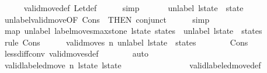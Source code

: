 \begin{isabellebody}
\ \ \ \ \isamarkupfalse%
\ valid{\isacharunderscore}move{\isacharprime}{\isacharunderscore}def\ Let{\isacharunderscore}def\isanewline
\ \ \ \ \isamarkupfalse%
\ simp\isanewline
\ \ \isamarkupfalse%
\ \isamarkupfalse%
\ {\isacharasterisk}{\isacharcolon}\ {\isachardoublequoteopen}unlabel\ {\isacharquery}l{\isacharunderscore}state{\isacharprime}\ {\isacharequal}\ state{\isacharprime}{\isachardoublequoteclose}\isanewline
\ \ \ \ \isamarkupfalse%
\ unlabel{\isacharunderscore}valid{\isacharunderscore}move{\isacharprime}{\isacharbrackleft}OF\ Cons{\isacharparenleft}{}{\isacharparenright}\ {\isacharasterisk}{\isacharasterisk}{\isacharcomma}\ THEN\ conjunct{}{\isacharbrackright}\isanewline
\ \ \ \ \isamarkupfalse%
\ simp\isanewline
\isanewline
\ \ \isamarkupfalse%
\ {\isachardoublequoteopen}map\ unlabel\ {\isacharparenleft}label{\isacharunderscore}moves{\isacharunderscore}max{\isacharunderscore}stone\ {\isacharquery}l{\isacharunderscore}state{\isacharprime}\ states{\isacharparenright}\ {\isacharequal}\ unlabel\ {\isacharquery}l{\isacharunderscore}state{\isacharprime}\ {\isacharhash}\ states{\isachardoublequoteclose}\isanewline
\ \ \isamarkupfalse%
\ {\isacharparenleft}rule\ Cons{\isacharparenleft}{}{\isacharparenright}{\isacharparenright}\isanewline
\ \ \ \ \isamarkupfalse%
\ {\isachardoublequoteopen}valid{\isacharunderscore}moves\ n\ {\isacharparenleft}{\isacharparenleft}unlabel\ {\isacharquery}l{\isacharunderscore}state{\isacharprime}{\isacharparenright}\ {\isacharhash}\ states{\isacharparenright}{\isachardoublequoteclose}\isanewline
\ \ \ \ \ \ \isamarkupfalse%
\ Cons{\isacharparenleft}{}{\isacharparenright}\ {\isacharasterisk}\isanewline
\ \ \ \ \ \ \isamarkupfalse%
\ less{\isacharunderscore}diff{\isacharunderscore}conv\ valid{\isacharunderscore}moves{\isacharunderscore}def\isanewline
\ \ \ \ \ \ \isamarkupfalse%
\ auto\isanewline
\ \ \isamarkupfalse%
\isanewline
\ \ \ \ \isamarkupfalse%
\ {\isachardoublequoteopen}valid{\isacharunderscore}labeled{\isacharunderscore}move\ n\ l{\isacharunderscore}state\ {\isacharquery}l{\isacharunderscore}state{\isacharprime}{\isachardoublequoteclose}\isanewline
\ \ \ \ \ \ \isamarkupfalse%
\ {\isacharasterisk}{\isacharasterisk}\isanewline
\ \ \ \ \ \ \isamarkupfalse%
\ valid{\isacharunderscore}labeled{\isacharunderscore}move{\isacharunderscore}def\isanewline

\end{isabellebody}
